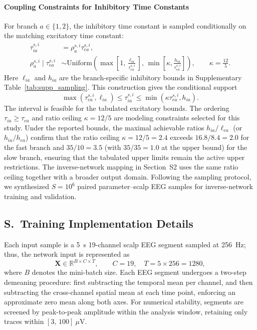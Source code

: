 \documentclass[11pt]{article}
\newcounter{suppsec}
\renewcommand{\thesuppsec}{S\arabic{suppsec}}
\newcommand{\suppsubsection}[1]{%
  \refstepcounter{suppsec}%
  \subsection*{\thesuppsec.\ #1}%
}
\begin{document}
\paragraph{Coupling Constraints for Inhibitory Time Constants}
For branch $a\in\{1,2\}$, the inhibitory time constant is sampled conditionally on the matching excitatory time constant:
\begin{equation}
\begin{aligned}
\tau_{ia}^{s,i}&=\rho_a^{s,i}\tau_{ea}^{s,i},\\
\rho_a^{s,i}\mid\tau_{ea}^{s,i}
&\sim\mathrm{Uniform}\!\left(
\max\!\left[1,\frac{\ell_{ia}}{\tau_{ea}^{s,i}}\right],\,
\min\!\left[\kappa,\frac{h_{ia}}{\tau_{ea}^{s,i}}\right]\right),
\qquad\kappa=\frac{12}{5}.
\end{aligned}
\tag{S1.5}\label{eq:supp_conditional_tau}
\end{equation}
Here $\ell_{ia}$ and $h_{ia}$ are the branch-specific inhibitory bounds in Supplementary Table~\ref{tab:supp_sampling}. This construction gives the conditional support
\[
\max(\tau_{ea}^{s,i},\ell_{ia})
\leq\tau_{ia}^{s,i}
\leq\min(\kappa\tau_{ea}^{s,i},h_{ia}).
\]
The interval is feasible for the tabulated excitatory bounds. The ordering $\tau_{ia}\geq\tau_{ea}$ and ratio ceiling $\kappa=12/5$ are modeling constraints selected for this study. Under the reported bounds, the maximal achievable ratios $h_{ia} / \ell_{ea}$ (or $h_{ia} / h_{ea}$) confirm that the ratio ceiling $\kappa = 12/5 = 2.4$ exceeds $16.8 / 8.4 = 2.0$ for the fast branch and $35 / 10 = 3.5$ (with $35 / 35 = 1.0$ at the upper bound) for the slow branch, ensuring that the tabulated upper limits remain the active upper restrictions. The inverse-network mapping in Section~S2 uses the same ratio ceiling together with a broader output domain. Following the sampling protocol, we synthesized $S=10^6$ paired parameter--scalp EEG samples for inverse-network training and validation.



\suppsubsection{Training Implementation Details}
\label{sec:supp_training}
Each input sample is a 5~s 19-channel scalp EEG segment sampled at 256~Hz; thus, the network input is represented as
\begin{equation}
    \mathbf{X}\in\mathbb{R}^{B\times C\times T},\qquad C=19,\quad T=5\times256=1280,
    \tag{S2.1}
\end{equation}
where $B$ denotes the mini-batch size. Each EEG segment undergoes a two-step demeaning procedure: first subtracting the temporal mean per channel, and then subtracting the cross-channel spatial mean at each time point, enforcing an approximate zero mean along both axes. For numerical stability, segments are screened by peak-to-peak amplitude within the analysis window, retaining only traces within $[3,\,100]~\mu$V.
\end{document}
